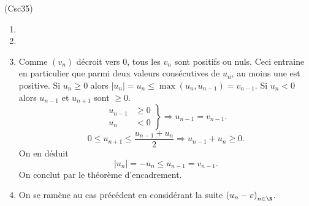 \begin{tiny}(Csc35)\end{tiny} 
\begin{enumerate}
 \item 
 \item
 \item Comme $(v_n)$ décroit vers $0$, tous les $v_n$ sont positifs ou nuls. Ceci entraine en particulier que parmi deux valeurs consécutives de $u_n$, au moins une est positive.\newline
 Si $u_n \geq 0$ alors $|u_n| = u_n \leq \max(u_n,u_{n-1}) = v_{n-1}$.\newline
 Si $u_n < 0$ alors $u_{n-1}$ et $u_{n+1}$ sont $\geq 0$.
\[
 \left. 
 \begin{aligned}
  u_{n-1} &\geq 0 \\ u_n &< 0
 \end{aligned}
 \right\rbrace \Rightarrow u_{n-1} = v_{n-1}.
\]
\[
 0 \leq u_{n+1} \leq \frac{u_{n-1} + u_n}{2}\Rightarrow u_{n-1} + u_n \geq 0.
\]
On en déduit
\[
 |u_n| = -u_n \leq u_{n-1} = v_{n-1}.
\]
On conclut par le théorème d'encadrement.

 \item On se ramène au cas précédent en considérant la suite $\left( u_n -v\right)_{n \in \N}$. 
\end{enumerate}
